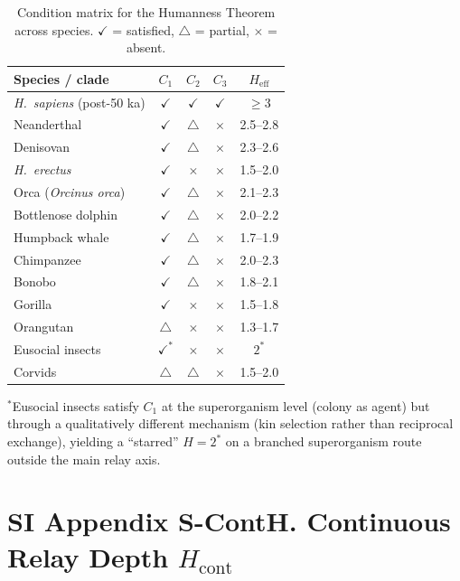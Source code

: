 \documentclass[11pt]{article}
\begin{document}
\begin{table}[htbp]
\centering
\caption{Condition matrix for the Humanness Theorem across species.
$\checkmark$ = satisfied, $\triangle$ = partial, $\times$ = absent.}
\label{tab:si_bio_matrix}
\begin{tabular}{lcccc}
\toprule
Species / clade & $C_1$ & $C_2$ & $C_3$ & $H_{\mathrm{eff}}$ \\
\midrule
\textit{H.~sapiens} (post-50 ka) & $\checkmark$ & $\checkmark$ & $\checkmark$ & $\ge 3$ \\
Neanderthal & $\checkmark$ & $\triangle$ & $\times$ & 2.5--2.8 \\
Denisovan & $\checkmark$ & $\triangle$ & $\times$ & 2.3--2.6 \\
\textit{H.~erectus} & $\checkmark$ & $\times$ & $\times$ & 1.5--2.0 \\
Orca (\textit{Orcinus orca}) & $\checkmark$ & $\triangle$ & $\times$ & 2.1--2.3 \\
Bottlenose dolphin & $\checkmark$ & $\triangle$ & $\times$ & 2.0--2.2 \\
Humpback whale & $\checkmark$ & $\triangle$ & $\times$ & 1.7--1.9 \\
Chimpanzee & $\checkmark$ & $\triangle$ & $\times$ & 2.0--2.3 \\
Bonobo & $\checkmark$ & $\triangle$ & $\times$ & 1.8--2.1 \\
Gorilla & $\checkmark$ & $\times$ & $\times$ & 1.5--1.8 \\
Orangutan & $\triangle$ & $\times$ & $\times$ & 1.3--1.7 \\
Eusocial insects & $\checkmark^*$ & $\times$ & $\times$ & $2^*$ \\
Corvids & $\triangle$ & $\triangle$ & $\times$ & 1.5--2.0 \\
\bottomrule
\end{tabular}
\end{table}

\noindent $^*$Eusocial insects satisfy $C_1$ at the superorganism level (colony as agent) but through a qualitatively different mechanism (kin selection rather than reciprocal exchange), yielding a ``starred'' $H{=}2^*$ on a branched superorganism route outside the main relay axis.


\section*{SI Appendix S-ContH. Continuous Relay Depth $H_{\mathrm{cont}}$}
\end{document}
